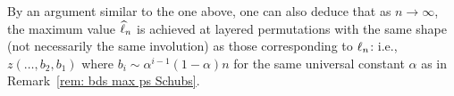 \documentclass[10pt]{article}
\begin{document}
\begin{remark}
By an argument similar to the one above, one can also deduce that as $n\to \infty$, the maximum value $\widehat{\ell}_n$ is achieved at layered permutations with the same shape (not necessarily the same involution) as those  corresponding to $\ell_n$: i.e., $z(\ldots,b_2,b_1)$ where $b_i \sim \alpha^{i-1}(1-\alpha)n$ for the same universal constant $\alpha$ as  in Remark~\ref{rem: bds max ps Schubs}.
\end{remark}



\end{document}
